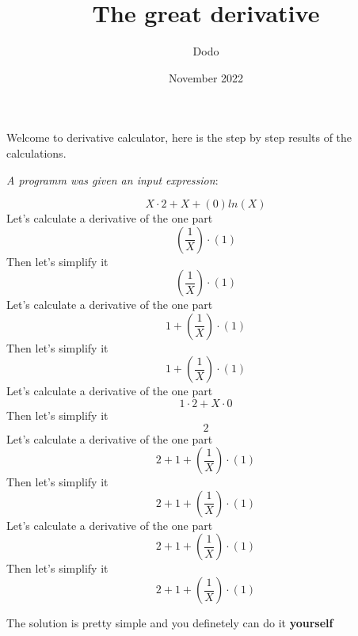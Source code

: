 \documentclass{article}
\title{The great derivative}
\author{Dodo}
\date{November 2022}
\begin{document}
    \maketitle
    
        Welcome to derivative calculator, here is the
        step by step results of the calculations.

        \textit{A programm was given an input expression}:

    
\begin{equation}
{{{X}\cdot{2}}+{{X}+{({0})ln({X})}}}
\end{equation}
Let's calculate a derivative of the one part\\
\begin{equation}
{({\frac{{1}}{{X}}})\cdot({1})}
\end{equation}
Then let's simplify it\\
\begin{equation}
{({\frac{{1}}{{X}}})\cdot({1})}
\end{equation}
Let's calculate a derivative of the one part\\
\begin{equation}
{{1}+{({\frac{{1}}{{X}}})\cdot({1})}}
\end{equation}
Then let's simplify it\\
\begin{equation}
{{1}+{({\frac{{1}}{{X}}})\cdot({1})}}
\end{equation}
Let's calculate a derivative of the one part\\
\begin{equation}
{{{1}\cdot{2}}+{{X}\cdot{0}}}
\end{equation}
Then let's simplify it\\
\begin{equation}
{2}
\end{equation}
Let's calculate a derivative of the one part\\
\begin{equation}
{{2}+{{1}+{({\frac{{1}}{{X}}})\cdot({1})}}}
\end{equation}
Then let's simplify it\\
\begin{equation}
{{2}+{{1}+{({\frac{{1}}{{X}}})\cdot({1})}}}
\end{equation}
Let's calculate a derivative of the one part\\
\begin{equation}
{{2}+{{1}+{({\frac{{1}}{{X}}})\cdot({1})}}}
\end{equation}
Then let's simplify it\\
\begin{equation}
{{2}+{{1}+{({\frac{{1}}{{X}}})\cdot({1})}}}
\end{equation}

        The solution is pretty simple and you definetely can do it \textbf{yourself}
        
\end{document}
